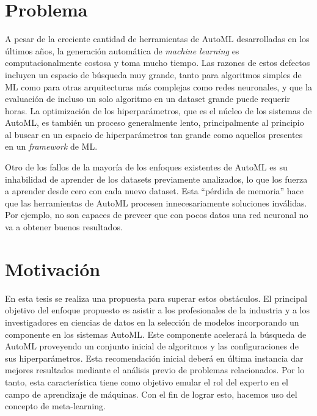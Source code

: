 \section*{Problema}

A pesar de la creciente cantidad de herramientas de AutoML desarrolladas en los últimos años, la generación automática de \textit{machine learning} es computacionalmente costosa y toma mucho tiempo. Las razones de estos defectos incluyen un espacio de búsqueda muy grande, tanto para algoritmos simples de ML como para otras arquitecturas más complejas como redes neuronales, y que la evaluación de incluso un solo algoritmo en un dataset grande puede requerir horas. La optimización de los hiperparámetros, que es el núcleo de los sistemas de AutoML, es también un proceso generalmente lento, principalmente al principio al buscar en un espacio de hiperparámetros tan grande como aquellos presentes en un \textit{framework} de ML.

Otro de los fallos de la mayoría de los enfoques existentes de AutoML es su inhabilidad de aprender de los datasets previamente analizados, lo que los fuerza a aprender desde cero con cada nuevo dataset. Esta ``pérdida de memoria'' hace que las herramientas de AutoML procesen innecesariamente soluciones inválidas. Por ejemplo, no son capaces de preveer que con pocos datos una red neuronal no va a obtener buenos resultados. 



\section*{Motivación}

En esta tesis se realiza una propuesta para superar estos obstáculos. El principal objetivo del enfoque propuesto es asistir a los profesionales de la industria y a los investigadores en ciencias de datos en la selección de modelos incorporando un componente en los sistemas AutoML. Este componente acelerará la búsqueda de AutoML proveyendo un conjunto inicial de algoritmos y las configuraciones de sus hiperparámetros. Esta recomendación inicial deberá en última instancia dar mejores resultados mediante el análisis previo de problemas relacionados. Por lo tanto, esta característica tiene como objetivo emular el rol del experto en el campo de aprendizaje de máquinas. Con el fin de lograr esto, hacemos uso del concepto de meta-learning. 

